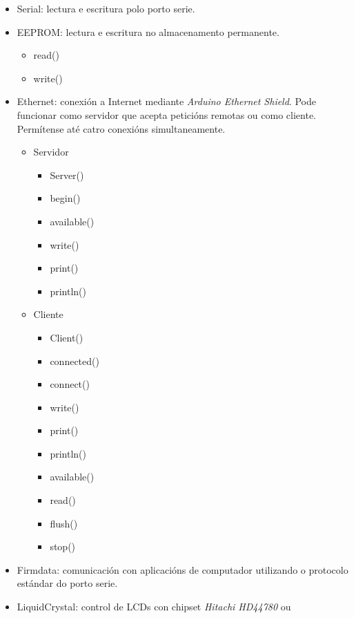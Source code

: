 \begin{itemize}
 \item Serial: lectura e escritura polo porto serie.
 \item EEPROM: lectura e escritura no almacenamento permanente.
       \begin{itemize}
        \item read()
        \item write()
       \end{itemize}
 \item Ethernet: conexión a Internet mediante \textit{Arduino Ethernet Shield}.
       Pode funcionar como servidor que acepta peticións remotas ou como
       cliente. Permítense até catro conexións simultaneamente.
       \begin{itemize}
        \item Servidor
              \begin{itemize}
               \item Server()
               \item begin()
               \item available()
               \item write()
               \item print()
               \item println()
              \end{itemize}
        \item Cliente
              \begin{itemize}
               \item Client()
               \item connected()
               \item connect()
               \item write()
               \item print()
               \item println()
               \item available()
               \item read()
               \item flush()
               \item stop()
              \end{itemize}
       \end{itemize}
 \item Firmdata: comunicación con aplicacións de computador utilizando o
       protocolo estándar do porto serie.
 \item LiquidCrystal: control de LCDs con chipset \textit{Hitachi HD44780} ou

\end{itemize}
